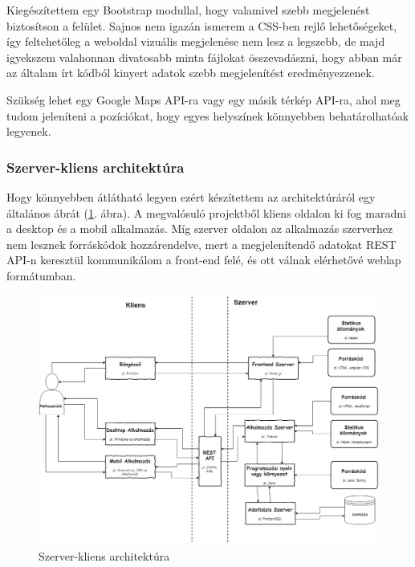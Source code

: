 Kiegészítettem egy Bootstrap modullal, hogy valamivel szebb megjelenést biztosítson a felület. Sajnos nem igazán ismerem a CSS-ben rejlő lehetőségeket, így feltehetőleg a weboldal vizuális megjelenése nem lesz a legszebb, de majd igyekszem valahonnan divatosabb minta fájlokat összevadászni, hogy abban már az általam írt kódból kinyert adatok szebb megjelenítést eredményezzenek.

Szükség lehet egy Google Maps API-ra vagy egy másik térkép API-ra, ahol meg tudom jeleníteni a pozíciókat, hogy egyes helyszínek könnyebben behatárolhatóak legyenek.



\subsubsection{Szerver-kliens architektúra}

Hogy könnyebben átlátható legyen ezért készítettem az architektúráról egy általános ábrát (\ref{fig:architecture}. ábra). 
A megvalósuló projektből kliens oldalon ki fog maradni a desktop és a mobil alkalmazás. Míg szerver oldalon az alkalmazás szerverhez nem lesznek forráskódok hozzárendelve, mert a megjelenítendő adatokat REST API-n keresztül kommunikálom a front-end felé, és ott válnak elérhetővé weblap formátumban.

\begin{figure}
\centering
\includegraphics[scale=0.365]{kepek/architecture.jpg}
\caption{Szerver-kliens architektúra}
\label{fig:architecture}
\end{figure}

